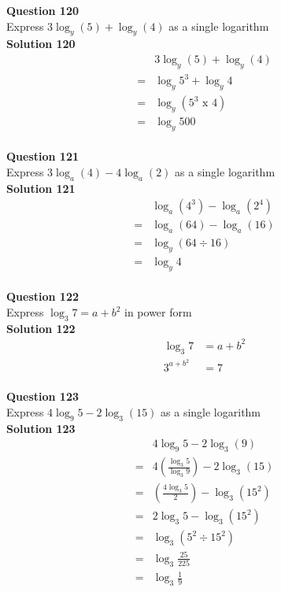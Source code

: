 \documentclass{article}
\begin{document}
\noindent\textbf{Question 120}\\[5pt]
Express $3\log_{y}(5)+\log_{y}(4)$ as a single logarithm\\[5pt]
\noindent\textbf{Solution 120}\\[5pt]
\begin{align*}
&3\log_{y}(5)+\log_{y}(4)\\[2pt]
=&\log_{y}5^3+\log_{y}4\\[2pt]
=&\log_{y}(5^3 \,\, \text{x} \,\, 4)\\[2pt]
=&\log_{y}500
\end{align*}\\[10pt]

\noindent\textbf{Question 121}\\[5pt]
Express $3\log_{a}(4)-4\log_{a}(2)$ as a single logarithm\\[5pt]
\noindent\textbf{Solution 121}\\[5pt]
\begin{align*}
&\log_{a}(4^3)-\log_{a}(2^4)\\[2pt]
=&\log_{a}(64)-\log_{a}(16)\\[2pt]
=&\log_{y}(64 \div 16)\\[2pt]
=&\log_{y}4
\end{align*}\\[10pt]

\noindent\textbf{Question 122}\\[5pt]
Express $\log_{3}7=a+b^2$ in power form\\[5pt]
\noindent\textbf{Solution 122}\\[5pt]
\begin{align*}
\log_{3}7&=a+b^2\\[2pt]
3^{a+b^2}&=7
\end{align*}\\[10pt]

\noindent\textbf{Question 123}\\[5pt]
Express $4\log_{9}5-2\log_{3}(15)$ as a single logarithm\\[5pt]
\noindent\textbf{Solution 123}\\[5pt]
\begin{align*}
&4\log_{9}5-2\log_{3}(9)\\[2pt]
=&4\left(\displaystyle\frac{\log_{3}5}{\log_{3}9}\right)-2\log_{3}(15)\\[2pt]
=&\left(\displaystyle\frac{4\log_{3}5}{2}\right)-\log_{3}(15^2)\\[2pt]
=&2\log_{3}5-\log_{3}(15^2)\\[2pt]
=&\log_{3}(5^2 \div 15^2)\\[2pt]
=&\log_{3}\displaystyle\frac{25}{225}\\[2pt]
=&\log_{3}\displaystyle\frac{1}{9}
\end{align*}\\[10pt]
\end{document}
